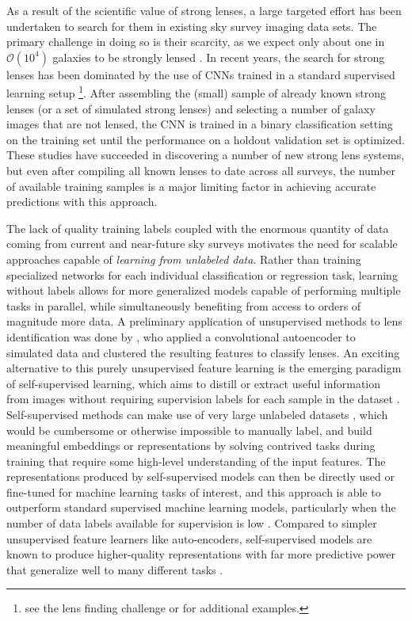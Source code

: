 \documentclass{aastex631}
\begin{document}
As a result of the scientific value of strong lenses, a large targeted effort has been undertaken to search for them in existing sky survey imaging data sets. The primary challenge in doing so is their scarcity, as we expect only about one in $\mathcal{O}(10^4)$ galaxies to be strongly lensed \citep{Collett}. In recent years, the search for strong lenses has been dominated by the use of CNNs trained in a standard supervised learning setup \citep[e.g.][]{JacobsI, JacobsII, JacobsIII, Lanusse, PetrilloI, PetrilloII, LI, He_lens,  CanamerasI, CanamerasII, HuangI, HuangII, Fabrizio}\footnote{see the lens finding challenge \citep{strong_lens_challenge} or \citealt{ml-in-cosmo} for additional examples.}. After assembling the (small) sample of already known strong lenses (or a set of simulated strong lenses) and selecting a number of galaxy images that are not lensed, the CNN is trained in a binary classification setting on the training set until the performance on a holdout validation set is optimized. These studies have succeeded in discovering a number of new strong lens systems, but even after compiling all known lenses to date across all surveys, the number of available training samples is a major limiting factor in achieving accurate predictions with this approach.

The lack of quality training labels coupled with the enormous quantity of data coming from current and near-future sky surveys motivates the need for scalable approaches capable of {\textit{learning from unlabeled data}}. Rather than training specialized networks for each individual classification or regression task, learning without labels allows for more generalized models capable of performing multiple tasks in parallel, while simultaneously benefiting from access to orders of magnitude more data. A preliminary application of unsupervised methods to lens identification was done by \citealt{stronglens_AE}, who applied a convolutional autoencoder to simulated data and clustered the resulting features to classify lenses. An exciting alternative to this purely unsupervised feature learning is the emerging paradigm of self-supervised learning, which aims to distill or extract useful information from images without requiring supervision labels for each sample in the dataset \citep{Zhai_2019_ICCV}. Self-supervised methods can make use of very large unlabeled datasets \citep[e.g., ][]{SEER}, which would be cumbersome or otherwise impossible to manually label, and build meaningful embeddings or representations by solving contrived tasks during training that require some high-level understanding of the input features. The representations produced by self-supervised models can then be directly used or fine-tuned for machine learning tasks of interest, and this approach is able to outperform standard supervised machine learning models, particularly when the number of data labels available for supervision is low \citep{chen2020simple, chen2020big, chen2020improved}. Compared to simpler unsupervised feature learners like auto-encoders, self-supervised models are known to produce higher-quality representations with far more predictive power \citep{bigan, bigan2} that generalize well to many different tasks \citep{DINO}.
\end{document}
